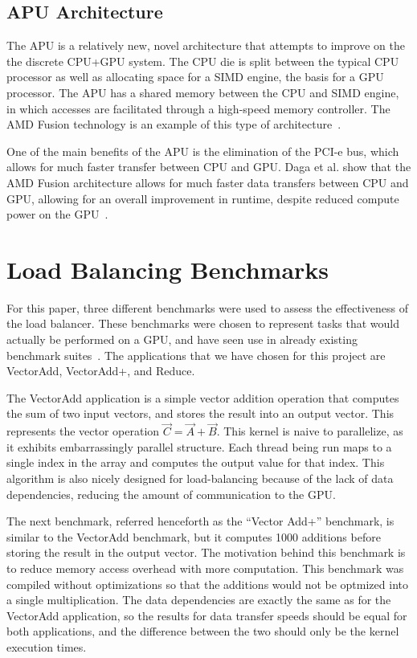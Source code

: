 \documentclass[journal]{IEEEtran}
\begin{document}
\subsection{APU Architecture}
The APU is a relatively new, novel architecture that attempts to 
improve on the the discrete CPU+GPU system.  The CPU die is split
between the typical CPU processor as well as allocating space
for a SIMD engine, the basis for a GPU processor.  The APU has a 
shared memory between the CPU and SIMD engine, in which accesses
are facilitated through a high-speed memory controller.  The AMD
Fusion technology is an example of this type of architecture~\cite{AMDFusion}.

One of the main benefits of the APU is the elimination of the PCI-e
bus, which allows for much faster transfer between CPU and GPU.  Daga et al.
show that the AMD Fusion architecture allows for much faster data transfers
between CPU and GPU, allowing for an overall improvement in runtime, despite
reduced compute power on the GPU~\cite{Daga2011}. 

\section{Load Balancing Benchmarks}
For this paper, three different benchmarks were used to assess the
effectiveness of the load balancer.  These benchmarks were chosen to represent
tasks that would actually be performed on a GPU, and have seen use in already
existing benchmark suites~\cite{Danalis2010}.  The applications that we have chosen
for this project are VectorAdd, VectorAdd+, and Reduce.

The VectorAdd application is a simple vector addition operation that computes the sum
of two input vectors, and stores the result into an output vector.  This represents the
vector operation $\vec{C} = \vec{A} + \vec{B}$.  This kernel is naive to parallelize, as
it exhibits embarrassingly parallel structure.  Each thread being run maps to a single 
index in the array and computes the output value for that index.  This algorithm is also
nicely designed for load-balancing because of the lack of data dependencies, reducing 
the amount of communication to the GPU.

The next benchmark, referred henceforth as the ``Vector Add+'' benchmark, is similar to
the VectorAdd benchmark, but it computes 1000 additions before storing the result
in the output vector.  The motivation behind this benchmark is to reduce memory
access overhead with more computation.  This benchmark was compiled without optimizations
so that the additions would not be optmized into a single multiplication.  The data
dependencies are exactly the same as for the VectorAdd application, so the results for
data transfer speeds should be equal for both applications, and the difference between
the two should only be the kernel execution times.
\end{document}
